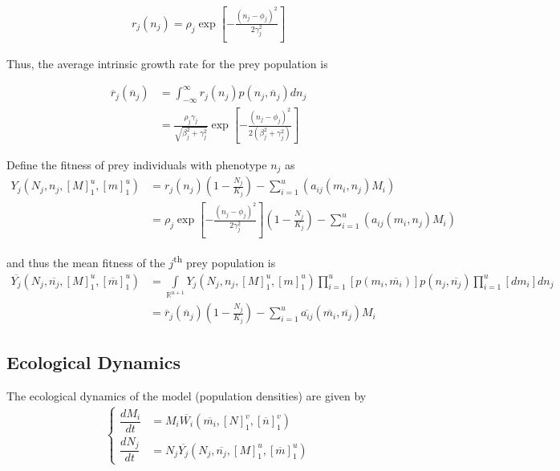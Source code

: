 \documentclass[12pt]{article}
\begin{document}
\begin{align*}
	r_j(n_j) = \rho_j\exp{\left[-\frac{(n_j - \phi_j)^2}{2\gamma_j^2}\right]}
\end{align*}

\noindent Thus, the average intrinsic growth rate for the prey population is

\begin{align*}
	\overline{r}_j(\overline{n}_j) &= \int_{-\infty}^\infty{r_j(n_j)p(n_j, \overline{n}_j)}dn_j \\
	&= \frac{\rho_j\gamma_j}{\sqrt{\beta_j^2 + \gamma_j^2}}\exp\left[{-\frac{(n_j - \phi_j)^2}{2(\beta_j^2 + \gamma_j^2)}}\right]
\end{align*}

\noindent Define the fitness of prey individuals with phenotype $n_j$ as
\begin{align*}
	Y_j(N_j, n_j, [M]_1^u, [m]_1^u) &= r_j(n_j)\left(1 - \frac{N_j}{K_j} \right) - \sum_{i = 1}^u\left(a_{ij}(m_i, n_j)M_i\right) \\
	&= \rho_j\exp{\left[-\frac{(n_j - \phi_j)^2}{2\gamma_j^2}\right]}\left(1 - \frac{N_j}{K_j}\right) - \sum_{i = 1}^u\left(a_{ij}(m_i, n_j)M_i\right)
\end{align*}

\noindent and thus the mean fitness of the $j$\textsuperscript{th} prey population is
\begin{align*}
	\overline{Y_j}(N_j, \overline{n_j}, [M]_1^u, [\overline{m}]_1^u) &= \int\limits_{\mathbb{R}^{u+1}} Y_j(N_j, n_j, [M]_1^u, [m]_1^u) \prod\limits_{i=1}^{u}\left[p(m_i, \overline{m_i})\right] p(n_j, \overline{n_j}) \prod\limits_{i=1}^{u}\left[dm_i\right] dn_j \\
	&= \overline{r}_j(\overline{n}_j) \left(1 - \frac{N_j}{K_j} \right) - \sum_{i = 1}^u \overline{a_{ij}}(\overline{m_i}, \overline{n_j}) M_i
\end{align*}

\subsection*{Ecological Dynamics}
\noindent The ecological dynamics of the model (population densities) are given by
\begin{align}
	\begin{cases}
		\dfrac{dM_i}{dt} &= M_i \overline{W_i}(\overline{m_i}, [N]_1^v, [\overline{n}]_1^v) \\[.25cm]
		\dfrac{dN_j}{dt} &= N_j \overline{Y_j}(N_j, \overline{n_j}, [M]_1^u, [\overline{m}]_1^u)
	\end{cases}
\end{align}
\end{document}

